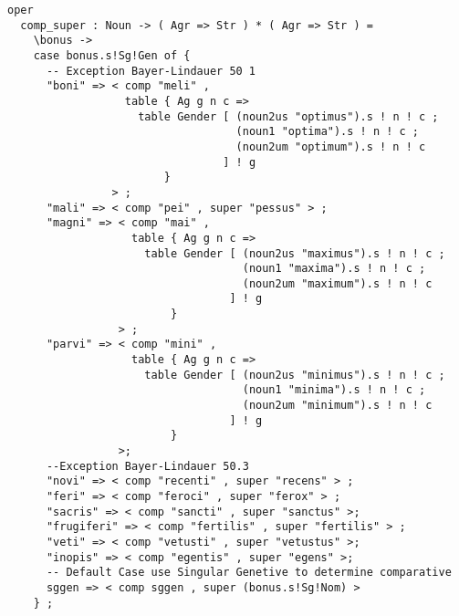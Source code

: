 \begin{lstlisting}[float=h!tp,caption={Funktion zur Bestimmung der Komparativ- und Superlativformen eines Adjektivs (vgl. \textbf{MorphoLat.gf})},label={GF-Morpho-CompSuper},basicstyle=\small]
oper
  comp_super : Noun -> ( Agr => Str ) * ( Agr => Str ) = 
    \bonus ->
    case bonus.s!Sg!Gen of {
      -- Exception Bayer-Lindauer 50 1
      "boni" => < comp "meli" , 
                  table { Ag g n c => 
                    table Gender [ (noun2us "optimus").s ! n ! c ; 
                                   (noun1 "optima").s ! n ! c ; 
                                   (noun2um "optimum").s ! n ! c 
                                 ] ! g 
                        } 
                > ;
      "mali" => < comp "pei" , super "pessus" > ;
      "magni" => < comp "mai" , 
                   table { Ag g n c => 
                     table Gender [ (noun2us "maximus").s ! n ! c ; 
                                    (noun1 "maxima").s ! n ! c ; 
                                    (noun2um "maximum").s ! n ! c 
                                  ] ! g 
                         } 
                 > ;
      "parvi" => < comp "mini" , 
                   table { Ag g n c => 
                     table Gender [ (noun2us "minimus").s ! n ! c ; 
                                    (noun1 "minima").s ! n ! c ; 
                                    (noun2um "minimum").s ! n ! c 
                                  ] ! g 
                         } 
                 >;
      --Exception Bayer-Lindauer 50.3
      "novi" => < comp "recenti" , super "recens" > ;
      "feri" => < comp "feroci" , super "ferox" > ;
      "sacris" => < comp "sancti" , super "sanctus" >;
      "frugiferi" => < comp "fertilis" , super "fertilis" > ;
      "veti" => < comp "vetusti" , super "vetustus" >;
      "inopis" => < comp "egentis" , super "egens" >;
      -- Default Case use Singular Genetive to determine comparative
      sggen => < comp sggen , super (bonus.s!Sg!Nom) >
    } ;
\end{lstlisting}
